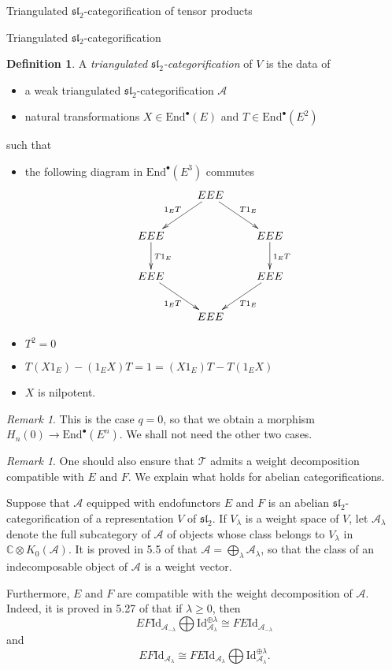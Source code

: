 \documentclass[12pt]{amsart}
\theoremstyle{definition}
\newtheorem{defn}[thm]{Definition}
\theoremstyle{remark}
\newtheorem{rmk}[thm]{Remark}
\theoremstyle{remark}
\begin{document}
\begin{section}{Triangulated $\mathfrak{sl}_{2}$-categorification of tensor products}
\begin{subsection}{Triangulated $\mathfrak{sl}_{2}$-categorification}
\begin{defn} \label{TriangCat} A {\it triangulated $\mathfrak{sl}_{2}$-categorification} of $V$ is the data of \begin{itemize} \item a weak triangulated $\mathfrak{sl}_{2}$-categorification $\mathcal{A}$  \item natural transformations $X \in \text{End}^{\bullet}(E)$ and $T \in \text{End}^{\bullet}(E^{2})$ \end{itemize} such that \begin{itemize} \item the following diagram in $\text{End}^{\bullet}(E^{3})$ commutes \[ \xymatrix{ & EEE \ar[dl]_{1_{E}T} \ar[dr]^{T1_{E}} & \\ EEE \ar[d]^{T1_{E}} & & EEE \ar[d]^{1_{E}T} \\ EEE \ar[dr]_{1_{E}T} & & EEE \ar[dl]^{T1_{E}} \\ & EEE & } \] \item $T^{2} = 0$ \item $T(X 1_{E})-(1_{E}X)T=1=(X 1_{E})T-T(1_{E}X)$ \item $X$ is nilpotent. \end{itemize} \end{defn}
  
\begin{rmk} This is the case $q = 0$, so that we obtain a morphism $H_{n}(0) \rightarrow \text{End}^{\bullet}(E^{n})$. We shall not need the other two cases. \end{rmk}

\begin{rmk} One should also ensure that $\mathcal{T}$ admits a weight decomposition compatible with $E$ and $F$. We explain what holds for abelian categorifications. 

Suppose that $\mathcal{A}$ equipped with endofunctors $E$ and $F$ is an abelian $\mathfrak{sl}_{2}$-categorification of a representation $V$ of $\mathfrak{sl}_{2}$. If $V_{\lambda}$ is a weight space of $V$, let $\mathcal{A}_{\lambda}$ denote the full subcategory of $\mathcal{A}$ of objects whose class belongs to $V_{\lambda}$ in $\mathbb{C} \otimes K_{0}(\mathcal{A})$. It is proved in 5.5 of \cite{ChuangRouquierDerivedEquivalencesSymmetricGroupsCategorification} that $\mathcal{A} = \bigoplus_{\lambda} \mathcal{A}_{\lambda}$, so that the class of an indecomposable object of $\mathcal{A}$ is a weight vector. 

Furthermore, $E$ and $F$ are compatible with the weight  decomposition of $\mathcal{A}$. Indeed, it is proved in 5.27 of \cite{ChuangRouquierDerivedEquivalencesSymmetricGroupsCategorification} that if $\lambda \geq 0$, then \[ EF\text{Id}_{\mathcal{A}_{-\lambda}} \bigoplus \text{Id}^{\oplus \lambda}_{\mathcal{A}_{\lambda}} \cong FE\text{Id}_{\mathcal{A}_{-\lambda}} \]  and  \[ EF\text{Id}_{\mathcal{A}_{\lambda}} \cong FE\text{Id}_{\mathcal{A}_{\lambda}} \bigoplus \text{Id}^{\oplus \lambda}_{\mathcal{A}_{\lambda}}. \] 


\end{rmk}
\end{subsection}
\end{section}
\end{document}
